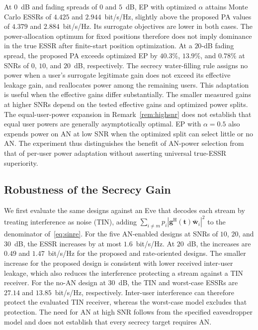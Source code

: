 \documentclass[journal]{IEEEtran}
\newcommand{\bt}{\mathbf{t}}
\newcommand{\bg}{\mathbf{g}}
\newcommand{\wb}{\bar{\mathbf{w}}}
\begin{document}
At $0$~dB and fading spreads of $0$ and $5$~dB, EP with optimized $\alpha$ attains Monte Carlo ESSRs of $4.425$ and $2.944$~bit/s/Hz, slightly above the proposed PA values of $4.379$ and $2.884$~bit/s/Hz. Its surrogate objectives are lower in both cases. The power-allocation optimum for fixed positions therefore does not imply dominance in the true ESSR after finite-start position optimization. At a $20$-dB fading spread, the proposed PA exceeds optimized EP by $40.3\%$, $13.9\%$, and $0.78\%$ at SNRs of $0$, $10$, and $20$~dB, respectively. The secrecy water-filling rule assigns no power when a user's surrogate legitimate gain does not exceed its effective leakage gain, and reallocates power among the remaining users. This adaptation is useful when the effective gains differ substantially. The smaller measured gains at higher SNRs depend on the tested effective gains and optimized power splits. The equal-user-power expansion in Remark~\ref{rem:highsnr} does not establish that equal user powers are generally asymptotically optimal. EP with $\alpha=0.5$ also expends power on AN at low SNR when the optimized split can select little or no AN. The experiment thus distinguishes the benefit of AN-power selection from that of per-user power adaptation without asserting universal true-ESSR superiority.

\subsection{Robustness of the Secrecy Gain}\label{sec:sim_rob}

We first evaluate the same designs against an Eve that decodes each stream by treating interference as noise (TIN), adding $\sum_{i\ne m}p_i|\bg^{\mathrm{H}}(\bt)\wb_i|^2$ to the denominator of~\eqref{eq:sinre}. For the five AN-enabled designs at SNRs of $10$, $20$, and $30$~dB, the ESSR increases by at most $1.6$~bit/s/Hz. At $20$~dB, the increases are $0.49$ and $1.47$~bit/s/Hz for the proposed and rate-oriented designs. The smaller increase for the proposed design is consistent with lower received inter-user leakage, which also reduces the interference protecting a stream against a TIN receiver. For the no-AN design at $30$~dB, the TIN and worst-case ESSRs are $27.14$ and $13.85$~bit/s/Hz, respectively. Inter-user interference can therefore protect the evaluated TIN receiver, whereas the worst-case model excludes that protection. The need for AN at high SNR follows from the specified eavesdropper model and does not establish that every secrecy target requires AN.
\end{document}
